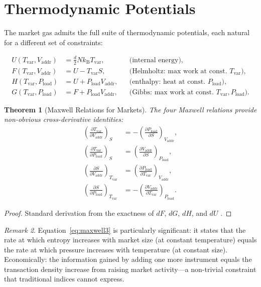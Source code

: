 \documentclass[twocolumn,10pt]{article}
\newtheorem{theorem}{Theorem}[section]
\theoremstyle{remark}
\newtheorem{remark}[theorem]{Remark}
\newcommand{\kB}{k_{\mathrm{B}}}
\newcommand{\Tvar}{T_{\mathrm{var}}}
\newcommand{\Pload}{P_{\mathrm{load}}}
\newcommand{\Vaddr}{V_{\mathrm{addr}}}
\begin{document}
\section{Thermodynamic Potentials}
\label{sec:potentials}

The market gas admits the full suite of thermodynamic potentials, each natural for a different set of constraints:

\begin{align}
    U(\Tvar, \Vaddr) &= \frac{d}{2} N \kB \Tvar, & & \text{(internal energy)}, \label{eq:U} \\
    F(\Tvar, \Vaddr) &= U - \Tvar S, & & \text{(Helmholtz: max work at const.\ } \Tvar\text{)}, \label{eq:F} \\
    H(\Tvar, \Pload) &= U + \Pload\Vaddr, & & \text{(enthalpy: heat at const.\ } \Pload\text{)}, \label{eq:H} \\
    G(\Tvar, \Pload) &= F + \Pload\Vaddr, & & \text{(Gibbs: max work at const.\ } \Tvar, \Pload\text{)}. \label{eq:G}
\end{align}

\begin{theorem}[Maxwell Relations for Markets]
\label{thm:maxwell_relations}
The four Maxwell relations provide non-obvious cross-derivative identities:
\begin{align}
    \left(\frac{\partial \Tvar}{\partial \Vaddr}\right)_S &= -\left(\frac{\partial \Pload}{\partial S}\right)_{\Vaddr}, \label{eq:maxwell1} \\
    \left(\frac{\partial \Tvar}{\partial \Pload}\right)_S &= \left(\frac{\partial \Vaddr}{\partial S}\right)_{\Pload}, \label{eq:maxwell2} \\
    \left(\frac{\partial S}{\partial \Vaddr}\right)_{\Tvar} &= \left(\frac{\partial \Pload}{\partial \Tvar}\right)_{\Vaddr}, \label{eq:maxwell3} \\
    \left(\frac{\partial S}{\partial \Pload}\right)_{\Tvar} &= -\left(\frac{\partial \Vaddr}{\partial \Tvar}\right)_{\Pload}. \label{eq:maxwell4}
\end{align}
\end{theorem}

\begin{proof}
Standard derivation from the exactness of $dF$, $dG$, $dH$, and $dU$ \cite{landau1980}.
\end{proof}

\begin{remark}
Equation~\eqref{eq:maxwell3} is particularly significant: it states that the rate at which entropy increases with market size (at constant temperature) equals the rate at which pressure increases with temperature (at constant size).  Economically: the information gained by adding one more instrument equals the transaction density increase from raising market activity---a non-trivial constraint that traditional indices cannot express.
\end{remark}
\end{document}
